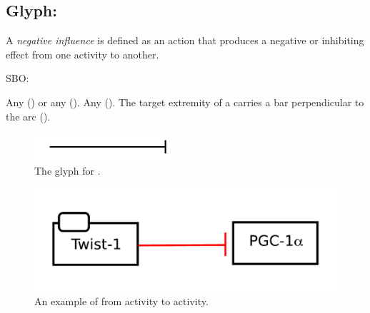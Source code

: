 \subsection{Glyph: }
\label{sec:af:negative_infl}

A \emph{negative influence} is defined as an action that produces a negative or inhibiting effect from one activity to another.

\begin{glyphDescription}

\glyphSboTerm SBO:

 \glyphOrigin Any  () or any  ().
 \glyphTarget Any  ().
 \glyphEndPoint The target extremity of a  carries a bar perpendicular to the arc ().


\end{glyphDescription}

\begin{figure}[H]
  \centering
  \includegraphics[width = 2in]{images/negativeInfluence}
  \caption{The \AF glyph for .}
  \label{fig:af:negativeInfl}
\end{figure}



\begin{figure}[H]
  \centering
  \includegraphics[width = 5in]{examples/ex-negativeInfluence}
  \caption{An example of  from  activity to  activity.}
  \label{fig:af:ex-NI}
\end{figure}